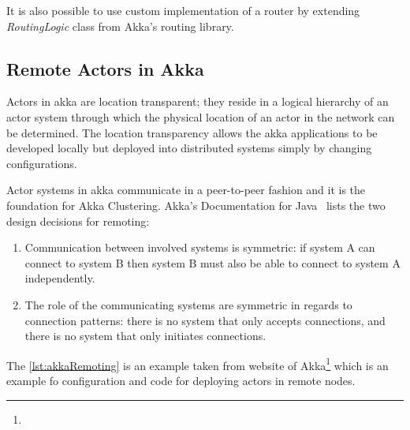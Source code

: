 It is also possible to use custom implementation of a router by extending \emph{RoutingLogic} class from Akka's routing library.

  \subsection{Remote Actors in Akka}
  Actors in akka are location transparent; they reside in a logical hierarchy of an actor system through which the physical location of an actor in the network can be determined. The location transparency allows the akka applications to be developed locally but deployed into distributed systems simply by changing configurations.~\cite{akkaJavaDoc}

  Actor systems in akka communicate in a peer-to-peer fashion and it is the foundation for Akka Clustering. Akka's Documentation for Java~\cite{akkaJavaDoc} lists the two design decisions for remoting:
\begin{enumerate}

  \item Communication between involved systems is symmetric: if system A can connect to system B then system B must also be able to connect to system A independently.

  \item The role of the communicating systems are symmetric in regards to connection patterns: there is no system that only accepts connections, and there is no system that only initiates connections.
\end{enumerate}

The \autoref{lst:akkaRemoting} is an example taken from website of Akka\footnote{} which is an example fo configuration and code for deploying actors in remote nodes.

